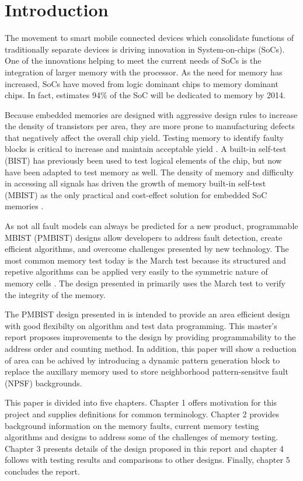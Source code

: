 \chapter{Introduction}
\label{chap:introduction}
The movement to smart mobile connected devices which consolidate functions of traditionally separate devices is driving innovation in System-on-chips (SoCs).  One of the innovations helping to meet the current needs of SoCs is the integration of larger memory with the processor.  As the need for memory has increased, SoCs have moved from logic dominant chips to memory dominant chips.  In fact, \cite{1327984} estimates 94\% of the SoC will be dedicated to memory by 2014.  

Because embedded memories are designed with aggressive design rules to increase the density of transistors per area, they are more prone to manufacturing defects that negatively affect the overall chip yield.  Testing memory to identify faulty blocks is critical to increase and maintain acceptable yield \cite{1395663}. 
A built-in self-test (BIST) has previously been used to test logical elements of the chip, but now have been adapted to test memory as well.  The density of memory and difficulty in accessing all signals has driven the growth of memory built-in self-test (MBIST) as the only practical and cost-effect solution for embedded SoC memories \cite{5875994}.  

As not all fault models can always be predicted for a new product, programmable MBIST (PMBIST) designs allow developers to address fault detection, create efficient algorithms, and overcome challenges presented by new technology.  The most common memory test today is the March test because its structured and repetive algorithms can be applied very easily to the symmetric nature of memory cells \cite{1675150}.  The design presented in \cite{1584083} primarily uses the March test to verify the integrity of the memory.  

The PMBIST design presented in \cite{1584083} is intended to provide an area efficient design with good flexibilty on algorithm and test data programming.  This master's report proposes improvements to the design by providing programmability to the address order and counting method.  In addition, this paper will show a reduction of area can be achived by introducing a dynamic pattern generation block to replace the auxillary memory used to store neighborhood pattern-sensitve fault (NPSF) backgrounds.

This paper is divided into five chapters.
Chapter 1 offers motivation for this project and supplies definitions for common terminology.  Chapter 2 provides background information on the memory faults, current memory testing algorithms and designs to address some of the challenges of memory testing.  Chapter 3 presents details of the design proposed in this report and chapter 4 follows with testing results and comparisons to other designs.
Finally, chapter 5 concludes the report.  





